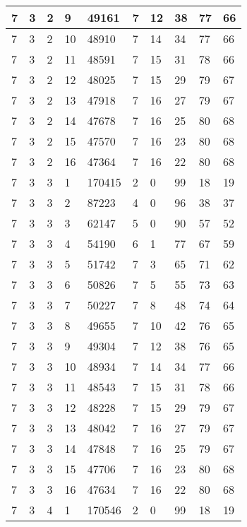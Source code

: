 \begin{table}[!ht]
\begin{tabular}{|l|l|l|l|l|l|l|l|l|l|}
        7 & 3 & 2 & 9 & 49161 & 7 & 12 & 38 & 77 & 66 \\ \hline
        7 & 3 & 2 & 10 & 48910 & 7 & 14 & 34 & 77 & 66 \\ \hline
        7 & 3 & 2 & 11 & 48591 & 7 & 15 & 31 & 78 & 66 \\ \hline
        7 & 3 & 2 & 12 & 48025 & 7 & 15 & 29 & 79 & 67 \\ \hline
        7 & 3 & 2 & 13 & 47918 & 7 & 16 & 27 & 79 & 67 \\ \hline
        7 & 3 & 2 & 14 & 47678 & 7 & 16 & 25 & 80 & 68 \\ \hline
        7 & 3 & 2 & 15 & 47570 & 7 & 16 & 23 & 80 & 68 \\ \hline
        7 & 3 & 2 & 16 & 47364 & 7 & 16 & 22 & 80 & 68 \\ \hline
        7 & 3 & 3 & 1 & 170415 & 2 & 0 & 99 & 18 & 19 \\ \hline
        7 & 3 & 3 & 2 & 87223 & 4 & 0 & 96 & 38 & 37 \\ \hline
        7 & 3 & 3 & 3 & 62147 & 5 & 0 & 90 & 57 & 52 \\ \hline
        7 & 3 & 3 & 4 & 54190 & 6 & 1 & 77 & 67 & 59 \\ \hline
        7 & 3 & 3 & 5 & 51742 & 7 & 3 & 65 & 71 & 62 \\ \hline
        7 & 3 & 3 & 6 & 50826 & 7 & 5 & 55 & 73 & 63 \\ \hline
        7 & 3 & 3 & 7 & 50227 & 7 & 8 & 48 & 74 & 64 \\ \hline
        7 & 3 & 3 & 8 & 49655 & 7 & 10 & 42 & 76 & 65 \\ \hline
        7 & 3 & 3 & 9 & 49304 & 7 & 12 & 38 & 76 & 65 \\ \hline
        7 & 3 & 3 & 10 & 48934 & 7 & 14 & 34 & 77 & 66 \\ \hline
        7 & 3 & 3 & 11 & 48543 & 7 & 15 & 31 & 78 & 66 \\ \hline
        7 & 3 & 3 & 12 & 48228 & 7 & 15 & 29 & 79 & 67 \\ \hline
        7 & 3 & 3 & 13 & 48042 & 7 & 16 & 27 & 79 & 67 \\ \hline
        7 & 3 & 3 & 14 & 47848 & 7 & 16 & 25 & 79 & 67 \\ \hline
        7 & 3 & 3 & 15 & 47706 & 7 & 16 & 23 & 80 & 68 \\ \hline
        7 & 3 & 3 & 16 & 47634 & 7 & 16 & 22 & 80 & 68 \\ \hline
        7 & 3 & 4 & 1 & 170546 & 2 & 0 & 99 & 18 & 19 \\ \hline

\end{tabular}
\end{table}
